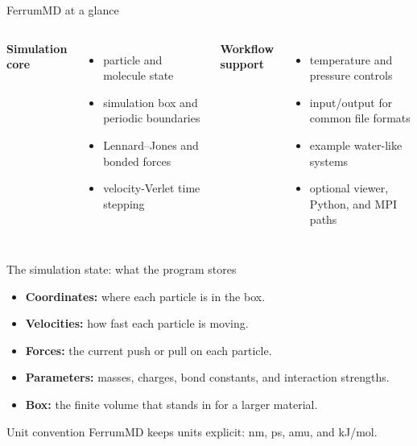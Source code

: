 \documentclass[aspectratio=169]{beamer}
\begin{document}
\begin{frame}{FerrumMD at a glance}
\begin{columns}[T]
\textbf{Simulation core}
\begin{itemize}
  \item particle and molecule state
  \item simulation box and periodic boundaries
  \item Lennard--Jones and bonded forces
  \item velocity-Verlet time stepping
\end{itemize}

\textbf{Workflow support}
\begin{itemize}
  \item temperature and pressure controls
  \item input/output for common file formats
  \item example water-like systems
  \item optional viewer, Python, and MPI paths
\end{itemize}
\end{columns}
\end{frame}

\begin{frame}{The simulation state: what the program stores}
\begin{itemize}
  \item \textbf{Coordinates:} where each particle is in the box.
  \item \textbf{Velocities:} how fast each particle is moving.
  \item \textbf{Forces:} the current push or pull on each particle.
  \item \textbf{Parameters:} masses, charges, bond constants, and interaction strengths.
  \item \textbf{Box:} the finite volume that stands in for a larger material.
\end{itemize}
\begin{block}{Unit convention}
FerrumMD keeps units explicit: nm, ps, amu, and kJ/mol.
\end{block}
\end{frame}
\end{document}
